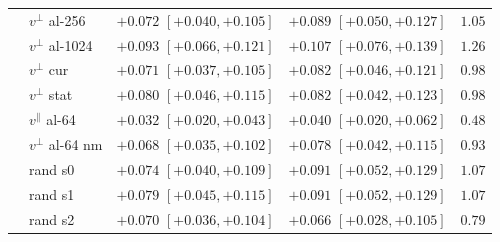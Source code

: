 \begin{tabular}{llccc}
 & $v^{\perp}$ al-256 & $+0.072$ {\scriptsize $[+0.040, +0.105]$} & $+0.089$ {\scriptsize $[+0.050, +0.127]$} & $1.05$ \\
 & $v^{\perp}$ al-1024 & $+0.093$ {\scriptsize $[+0.066, +0.121]$} & $+0.107$ {\scriptsize $[+0.076, +0.139]$} & $1.26$ \\
 & $v^{\perp}$ cur & $+0.071$ {\scriptsize $[+0.037, +0.105]$} & $+0.082$ {\scriptsize $[+0.046, +0.121]$} & $0.98$ \\
 & $v^{\perp}$ stat & $+0.080$ {\scriptsize $[+0.046, +0.115]$} & $+0.082$ {\scriptsize $[+0.042, +0.123]$} & $0.98$ \\
 & $v^{\parallel}$ al-64 & $+0.032$ {\scriptsize $[+0.020, +0.043]$} & $+0.040$ {\scriptsize $[+0.020, +0.062]$} & $0.48$ \\
 & $v^{\perp}$ al-64 nm & $+0.068$ {\scriptsize $[+0.035, +0.102]$} & $+0.078$ {\scriptsize $[+0.042, +0.115]$} & $0.93$ \\
 & rand s0 & $+0.074$ {\scriptsize $[+0.040, +0.109]$} & $+0.091$ {\scriptsize $[+0.052, +0.129]$} & $1.07$ \\
 & rand s1 & $+0.079$ {\scriptsize $[+0.045, +0.115]$} & $+0.091$ {\scriptsize $[+0.052, +0.129]$} & $1.07$ \\
 & rand s2 & $+0.070$ {\scriptsize $[+0.036, +0.104]$} & $+0.066$ {\scriptsize $[+0.028, +0.105]$} & $0.79$ \\
\bottomrule
\end{tabular}
